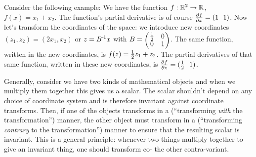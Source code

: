 Consider the following example: We have the function
$f: {\mathbb{R}}^2 \to {\mathbb{R}}$, $f(x) = x_1 + x_2$. The function's partial
derivative is of course $\frac{\partial f}{\partial x} = (1 ~~ 1)$. Now let's
transform the coordinates of the space: we introduce new coordinates
$(z_1, z_2) = (2x_1, x_2)$ or $z = B^{{\hspace*{-.0pt}\text{\rm -}\hspace*{-.5pt}}1} x$ with $B=\mat{cc}{\half & 0 \\ 0 &
1}$. The same function, written in the new coordinates, is $f(z)
= \frac{1}{2} z_1 + z_2$. The partial derivatives of that same function,
written in these new coordinates, is $\frac{\partial f}{\partial z} = (\frac{1}{2}
~~ 1)$.







Generally, consider we have two kinds of mathematical objects and when we
multiply them together this gives us a scalar. The scalar shouldn't
depend on any choice of coordinate system and is therefore invariant
against coordinate transforms. Then, if one of the objects transforms
in a  (``transforming \emph{with} the transformation'')
manner, the other object must transform in a 
(``transforming
\emph{contrary} to the transformation'') manner to ensure
that the resulting scalar is invariant. This is a general principle:
whenever two things multiply together to give an invariant thing, one
should transform co- the other contra-variant.

